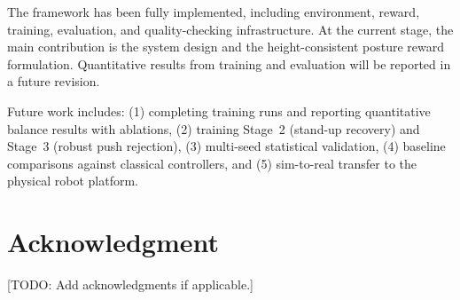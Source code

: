 \documentclass[conference]{IEEEtran}
\begin{document}
The framework has been fully implemented, including environment, reward, training, evaluation, and quality-checking infrastructure. At the current stage, the main contribution is the system design and the height-consistent posture reward formulation. Quantitative results from training and evaluation will be reported in a future revision.

Future work includes: (1) completing training runs and reporting quantitative balance results with ablations, (2) training Stage~2 (stand-up recovery) and Stage~3 (robust push rejection), (3) multi-seed statistical validation, (4) baseline comparisons against classical controllers, and (5) sim-to-real transfer to the physical robot platform.

\section*{Acknowledgment}
[TODO: Add acknowledgments if applicable.]
\end{document}

